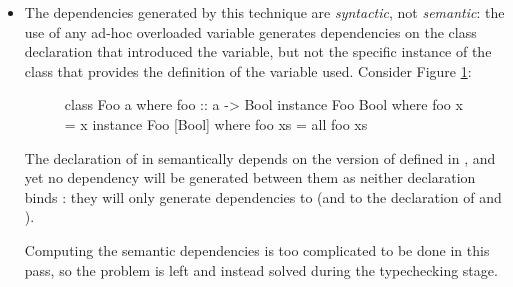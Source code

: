 \documentclass[dissertation.tex]{subfiles}
\begin{document}
{{{\begin{itemize}
{                Variable declarations such as  are usually treated as being the unique binding
                definition of , and any other uses within the same level of scope must be free rather than
                binding (otherwise we have conflicting definitions).
                
                However, we treat binding declarations inside  declarations as actually being free
                uses rather than binding uses, so that the instance declaration forms a dependence on the class
                declaration where the variables are bound, ensuring it is typechecked first.

            }
            \item
            {

                The dependencies generated by this technique are \textit{syntactic}, not \textit{semantic}: the use of
                any ad-hoc overloaded variable generates dependencies on the class declaration that introduced the
                variable, but not the specific instance of the class that provides the definition of the variable used.
                Consider Figure \ref{code:syntactic-vs-semantic}:

                \begin{figure}[h]
                \begin{haskellfigure}
                class Foo a where
                    foo :: a -> Bool
                instance Foo Bool where
                    foo x = x
                instance Foo [Bool] where
                    foo xs = all foo xs
                \end{haskellfigure}
                \caption{}
                \label{code:syntactic-vs-semantic}
                \end{figure}

                The declaration of  in  semantically depends on the version of
                 defined in , and yet no dependency will be generated between
                them as neither declaration binds : they will only generate dependencies to  (and to the declaration of  and ).

                Computing the semantic dependencies is too complicated to be done in this pass, so the problem is left
                and instead solved during the typechecking stage.

}
\end{itemize}}}}
\end{document}
